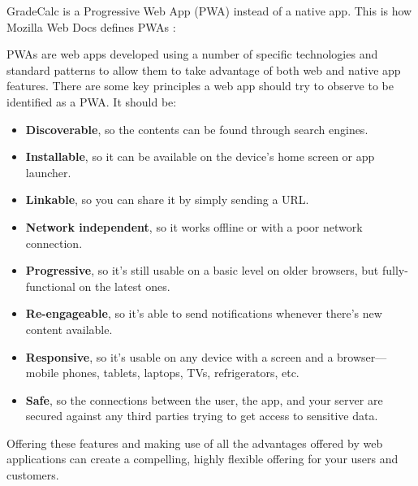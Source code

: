 




\clearpage\newpage\noindent
GradeCalc is a Progressive Web App (PWA) instead of a native app. This is how Mozilla Web Docs defines PWAs \cite{pwa-mozilla}:

PWAs are web apps developed using a number of specific technologies and standard patterns to allow them to take advantage of both web and native app features. There are some key principles a web app should try to observe to be identified as a PWA. It should be:

\begin{itemize}[noitemsep]
    \item \textbf{Discoverable}, so the contents can be found through search engines.
    \item \textbf{Installable}, so it can be available on the device's home screen or app launcher.
    \item \textbf{Linkable}, so you can share it by simply sending a URL.
    \item \textbf{Network independent}, so it works offline or with a poor network connection.
    \item \textbf{Progressive}, so it's still usable on a basic level on older browsers, but fully-functional on the latest ones.
    \item \textbf{Re-engageable}, so it's able to send notifications whenever there's new content available.
    \item \textbf{Responsive}, so it's usable on any device with a screen and a browser—mobile phones, tablets, laptops, TVs, refrigerators, etc.
    \item \textbf{Safe}, so the connections between the user, the app, and your server are secured against any third parties trying to get access to sensitive data.
\end{itemize}

\noindent
Offering these features and making use of all the advantages offered by web applications can create a compelling, highly flexible offering for your users and customers.


